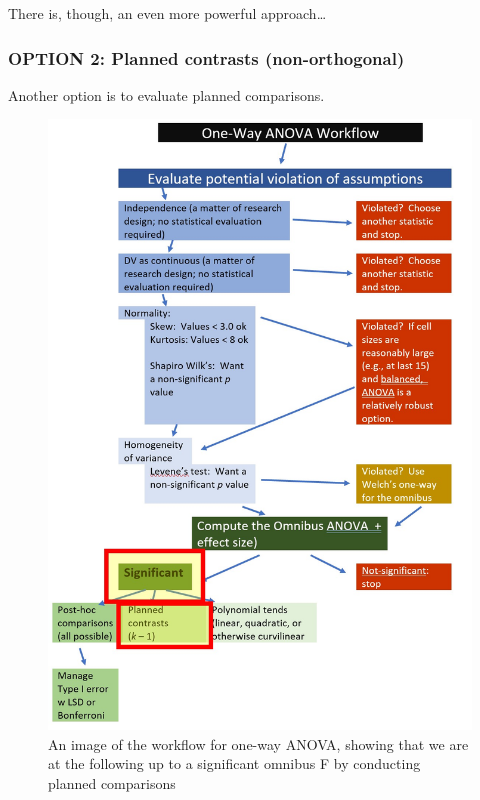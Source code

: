 \documentclass[
  11pt,
]{book}
\begin{document}
There is, though, an even more powerful approach\ldots{}

\hypertarget{option-2-planned-contrasts-non-orthogonal}{%
\subsubsection{OPTION 2: Planned contrasts (non-orthogonal)}\label{option-2-planned-contrasts-non-orthogonal}}

Another option is to evaluate planned comparisons.

\begin{figure}
\centering
\includegraphics{images/oneway/OnewayWrkFlw_planned.jpg}
\caption{An image of the workflow for one-way ANOVA, showing that we are at the following up to a significant omnibus F by conducting planned comparisons}
\end{figure}
\end{document}
